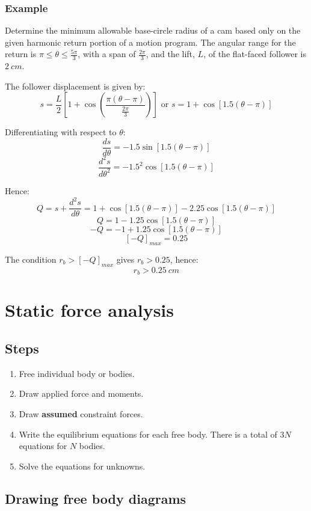 \documentclass[11pt]{article}
\begin{document}
\subsubsection{Example}
\label{sec:orgfb3e1af}
Determine the minimum allowable base-circle radius of a cam based only on the given harmonic return portion of a motion program. The angular range for the return is \(\pi \le \theta \le \frac{5 \pi}{3}\), with a span of \(\frac{2\pi}{3}\), and the lift, \(L\), of the flat-faced follower is \(\qty{2}{cm}\).

The follower displacement is given by:
\[s = \frac{L}{2} \left[1 + \cos \left(\frac{\pi (\theta - \pi)}{\frac{2\pi}{3}} \right) \right] \text{ or } s = 1 + \cos [1.5 (\theta - \pi)]\]

Differentiating with respect to \(\theta\):
\[\frac{ds}{d \theta} = - 1.5 \sin [1.5 (\theta - \pi)]\]
\[\frac{d^2 s}{d \theta^2} = - 1.5^2 \cos [1.5 (\theta - \pi)]\]

Hence:
\[Q = s + \frac{d^2 s}{d \theta} = 1 + \cos [1.5 (\theta - \pi)] - 2.25 \cos [1.5(\theta - \pi)]\]
\[Q = 1 - 1.25 \cos [1.5(\theta - \pi)]\]
\[-Q = -1 + 1.25 \cos [1.5(\theta - \pi)]\]
\[[-Q]_{max} = 0.25\]

The condition \(r_b > [-Q]_{max}\) gives \(r_b > 0.25\), hence:
\[r_b > \qty{0.25}{cm}\]
\section{Static force analysis}
\label{sec:org0a65ff1}

\subsection{Steps}
\label{sec:org99157e8}
\begin{enumerate}
\item Free individual body or bodies.
\item Draw applied force and moments.
\item Draw \textbf{assumed} constraint forces.
\item Write the equilibrium equations for each free body. There is a total of \(3N\) equations for \(N\) bodies.
\item Solve the equations for unknowns.
\end{enumerate}
\subsection{Drawing free body diagrams}
\label{sec:org424fd21}
\end{document}
